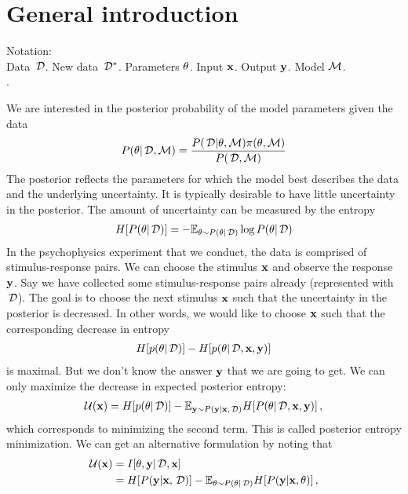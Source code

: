 
\section*{General introduction} %
\label{sec:general_introduction}
Notation: \\
Data $\,\mathcal{D}$. New data $\,\mathcal{D}^*$. Parameters $\theta$. Input ${\bf x}$. Output ${\bf y}$. Model $\mathcal{M}$. \\
.

We are interested in the posterior probability of the model parameters given the data
\begin{align}\label{eq:posterior}
	{P(\theta| \,\mathcal{D}, \mathcal{M})} = \frac{{P(\,\mathcal{D} | \theta, \mathcal{M})} {\pi(\theta, \mathcal{M})}}{{P(\,\mathcal{D}, \mathcal{M})}}
\end{align}
The posterior reflects the parameters for which the model best describes the data and the underlying uncertainty. It is typically desirable to have little uncertainty in the posterior. The amount of uncertainty can be measured by the entropy
\begin{align}
	H[{P(\theta | \,\mathcal{D})}] =
	- \mathbb{E}_{\theta \sim {P(\theta| \,\mathcal{D})}}
	\log {P(\theta| \,\mathcal{D})}
\end{align}
In the psychophysics experiment that we conduct, the data is comprised of stimulus-response pairs. We can choose the stimulus ${\bf x}$ and observe the response ${\bf y}$. Say we have collected some stimulus-response pairs already (represented with $\,\mathcal{D}$). The goal is to choose the next stimulus ${\bf x}$ such that the uncertainty in the posterior is decreased. In other words, we would like to choose ${\bf x}$ such that the corresponding decrease in entropy
\begin{align}
	H[p(\theta | \,\mathcal{D})] - H[p(\theta | \,\mathcal{D}, {\bf x}, {\bf y})]
\end{align}
is maximal. But we don't know the answer ${\bf y}$ that we are going to get. We can only maximize the decrease in expected posterior entropy:
\begin{align}
	\mathcal{U}({\bf x})
	= H[p(\theta | \,\mathcal{D})]
	- \mathbb{E}_{{\bf y} \sim {P({\bf y}| {\bf x}, \,\mathcal{D})}} H[{P(\theta | \,\mathcal{D}, {\bf x}, {\bf y})}] \,,
\end{align}
which corresponds to minimizing the second term. This is called posterior entropy minimization.
We can get an alternative formulation by noting that
\begin{align}
	\mathcal{U}({\bf x})
	&= I[\theta, {\bf y} | \,\mathcal{D}, {\bf x}] \\
	&= H[{P({\bf y} | {\bf x}, \,\mathcal{D})}]
	- \mathbb{E}_{\theta \sim {P(\theta| \,\mathcal{D})}} H[{P({\bf y} | {\bf x}, \theta)}] \,,
\end{align}
